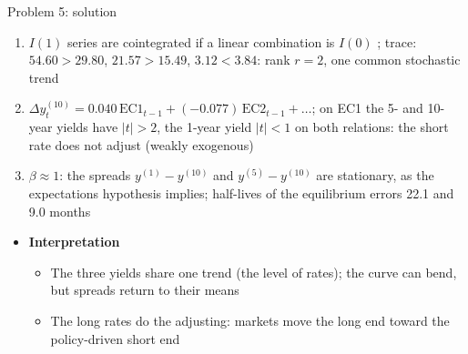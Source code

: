 \begin{frame}{Problem 5: solution}
\itemsize{\footnotesize}
\begin{enumerate}
    \item $I(1)$ series are cointegrated if a linear combination is $I(0)$ ; trace: $54.60 > 29.80$, $21.57 > 15.49$, $3.12 < 3.84$: rank $r = 2$, one common stochastic trend 
    \item $\Delta y^{(10)}_t = 0.040\,\mathrm{EC1}_{t-1} + (\ensuremath{-}0.077)\,\mathrm{EC2}_{t-1} + \dots$; on EC1 the 5- and 10-year yields have $|t| > 2$, the 1-year yield $|t| < 1$ on both relations: the short rate does not adjust (weakly exogenous)
    \item $\beta \approx 1$: the spreads $y^{(1)} - y^{(10)}$ and $y^{(5)} - y^{(10)}$ are stationary, as the expectations hypothesis implies; half-lives of the equilibrium errors 22.1 and 9.0 months
\end{enumerate}
\begin{itemize}
    \item \textbf{Interpretation}
    \begin{itemize}
        \item The three yields share one trend (the level of rates); the curve can bend, but spreads return to their means
        \item The long rates do the adjusting: markets move the long end toward the policy-driven short end
    \end{itemize}
\end{itemize}
\end{frame}

